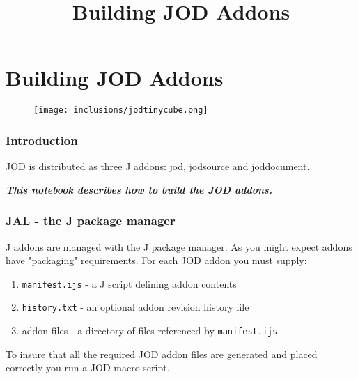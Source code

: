 \documentclass[11pt,letter,landscape]{article}
\title{Building JOD Addons}
\makeatletter
\def\maxwidth{\ifdim\Gin@nat@width>\linewidth\linewidth
    \else\Gin@nat@width\fi}
\let\Oldincludegraphics\includegraphics
\renewcommand{\includegraphics}[1]{\Oldincludegraphics[width=.8\maxwidth]{#1}}
\makeatother
\begin{document}
    
    
    \maketitle
    
    

    
    \section{Building JOD Addons}\label{building-jod-addons}

\begin{figure}
\centering
\texttt{[image: inclusions/jodtinycube.png]}
\caption{}
\end{figure}

    \subsubsection{Introduction}\label{introduction}

JOD is distributed as three J addons:
\href{https://code.jsoftware.com/wiki/Addons/general/jod}{jod},
\href{https://code.jsoftware.com/wiki/Addons/general/jodsource}{jodsource}
and
\href{https://code.jsoftware.com/wiki/Addons/general/joddocument}{joddocument}.

\textbf{\emph{This notebook describes how to build the JOD addons.}}

\subsubsection{JAL - the J package
manager}\label{jal---the-j-package-manager}

J addons are managed with the
\href{https://code.jsoftware.com/wiki/JAL/User_Guide}{J package
manager}. As you might expect addons have "packaging" requirements. For
each JOD addon you must supply:

\begin{enumerate}
\def\labelenumi{\arabic{enumi}.}
\item
  \texttt{manifest.ijs} - a J script defining addon contents
\item
  \texttt{history.txt} - an optional addon revision history file
\item
  addon files - a directory of files referenced by \texttt{manifest.ijs}
\end{enumerate}

To insure that all the required JOD addon files are generated and placed
correctly you run a JOD macro script.
\end{document}
